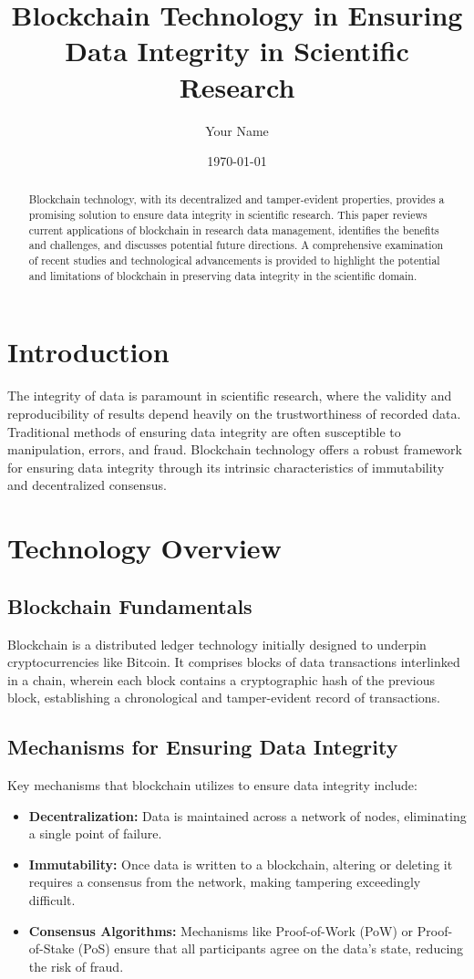 \documentclass{article}
\title{Blockchain Technology in Ensuring Data Integrity in Scientific Research}
\author{Your Name}
\date{\today}
\begin{document}
\maketitle

\begin{abstract}
Blockchain technology, with its decentralized and tamper-evident properties, provides a promising solution to ensure data integrity in scientific research. This paper reviews current applications of blockchain in research data management, identifies the benefits and challenges, and discusses potential future directions. A comprehensive examination of recent studies and technological advancements is provided to highlight the potential and limitations of blockchain in preserving data integrity in the scientific domain.
\end{abstract}

\section{Introduction}
The integrity of data is paramount in scientific research, where the validity and reproducibility of results depend heavily on the trustworthiness of recorded data. Traditional methods of ensuring data integrity are often susceptible to manipulation, errors, and fraud. Blockchain technology offers a robust framework for ensuring data integrity through its intrinsic characteristics of immutability and decentralized consensus.

\section{Technology Overview}
\subsection{Blockchain Fundamentals}
Blockchain is a distributed ledger technology initially designed to underpin cryptocurrencies like Bitcoin. It comprises blocks of data transactions interlinked in a chain, wherein each block contains a cryptographic hash of the previous block, establishing a chronological and tamper-evident record of transactions.

\subsection{Mechanisms for Ensuring Data Integrity}
Key mechanisms that blockchain utilizes to ensure data integrity include:
\begin{itemize}
    \item \textbf{Decentralization:} Data is maintained across a network of nodes, eliminating a single point of failure.
    \item \textbf{Immutability:} Once data is written to a blockchain, altering or deleting it requires a consensus from the network, making tampering exceedingly difficult.
    \item \textbf{Consensus Algorithms:} Mechanisms like Proof-of-Work (PoW) or Proof-of-Stake (PoS) ensure that all participants agree on the data's state, reducing the risk of fraud.
\end{itemize}
\end{document}
